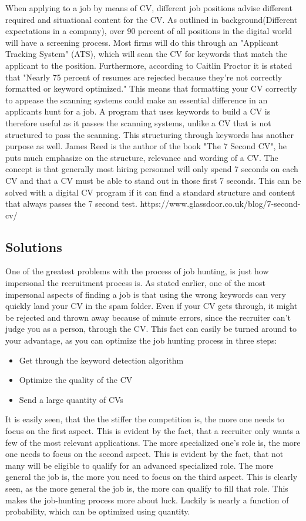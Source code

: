 When applying to a job by means of CV, different job positions advise different required and situational content for the CV.
As outlined in background(Different expectations in a company), over 90 percent of all positions in the digital world will have a screening process.
Most firms will do this through an "Applicant Tracking System" (ATS), which will scan the CV for keywords that match the applicant to the position.
Furthermore, according to Caitlin Proctor it is stated that "Nearly 75 percent of resumes are rejected because they’re not correctly formatted or keyword optimized."
This means that formatting your CV correctly to appease the scanning systems could make an essential difference in an applicants hunt for a job.
A program that uses keywords to build a CV is therefore useful as it passes the scanning systems, unlike a CV that is not structured to pass the scanning.
This structuring through keywords has another purpose as well.
James Reed is the author of the book "The 7 Second CV", he puts much emphasize on the structure, relevance and wording of a CV.
The concept is that generally most hiring personnel will only spend 7 seconds on each CV and that a CV must be able to stand out in those first 7 seconds.
This can be solved with a digital CV program if it can find a standard structure and content that always passes the 7 second test.
https://www.glassdoor.co.uk/blog/7-second-cv/

\subsection{Solutions}
One of the greatest problems with the process of job hunting, is just how impersonal
the recruitment process is. As stated earlier, one of the most impersonal aspects
of finding a job is that using the wrong keywords can very
quickly land your CV in the spam folder.
Even if your CV gets through, it might be rejected and thrown away because of
minute errors, since the recruiter can't judge you as a person, through the CV.
This fact can easily be turned around to your advantage, as you can optimize the
job hunting process in three steps:
\begin{itemize}
  \item Get through the keyword detection algorithm
  \item Optimize the quality of the CV
  \item Send a large quantity of CVs
\end{itemize}

It is easily seen, that the the stiffer the competition is, the more one 
needs to focus on the first aspect. This is evident by the fact, that a 
recruiter only wants a few of the most relevant applications.
The more specialized one's role is, the more one needs to focus on the second
aspect. This is evident by the fact, that not many will be eligible to qualify
for an advanced specialized role.
The more general the job is, the more you need to focus on the third
aspect. This is clearly seen, as the more general the job is, the more can 
qualify to fill that role. This makes the job-hunting process more about luck.
Luckily is nearly a function of probability, which can be optimized using
quantity.

